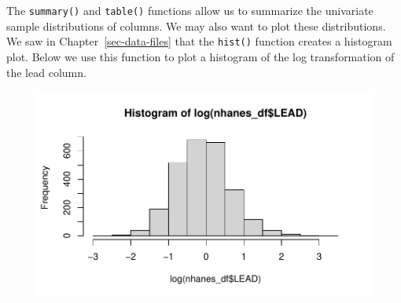 \documentclass[
  letterpaper,
]{krantz}
\makeatletter
\newenvironment{Shaded}{\begin{snugshade}}{\end{snugshade}}
\newcommand{\CommentTok}[1]{\textcolor[rgb]{0.37,0.37,0.37}{#1}}
\newcommand{\FunctionTok}[1]{\textcolor[rgb]{0.28,0.35,0.67}{#1}}
\newcommand{\NormalTok}[1]{\textcolor[rgb]{0.00,0.23,0.31}{#1}}
\newcommand{\OtherTok}[1]{\textcolor[rgb]{0.00,0.23,0.31}{#1}}
\newcommand{\SpecialCharTok}[1]{\textcolor[rgb]{0.37,0.37,0.37}{#1}}
\newcommand{\StringTok}[1]{\textcolor[rgb]{0.13,0.47,0.30}{#1}}
\newenvironment{kframe}{%
\medskip{}
\setlength{\fboxsep}{.8em}
 \def\at@end@of@kframe{}%
 \ifinner\ifhmode%
  \def\at@end@of@kframe{\end{minipage}}%
  \begin{minipage}{\columnwidth}%
 \fi\fi%
 \def\FrameCommand##1{\hskip\@totalleftmargin \hskip-\fboxsep
 \colorbox{shadecolor}{##1}\hskip-\fboxsep
     \hskip-\linewidth \hskip-\@totalleftmargin \hskip\columnwidth}%
 \MakeFramed {\advance\hsize-\width
   \@totalleftmargin\z@ \linewidth\hsize
   \@setminipage}}%
 {\par\unskip\endMakeFramed%
 \at@end@of@kframe}
\renewenvironment{Shaded}{\begin{kframe}}{\end{kframe}}
\makeatother
\begin{document}
\begin{Shaded}
\end{Shaded}

The \texttt{summary()} and \texttt{table()} functions allow us to
summarize the univariate sample distributions of columns. We may also
want to plot these distributions. We saw in Chapter~\ref{sec-data-files}
that the \texttt{hist()} function creates a histogram plot. Below we use
this function to plot a histogram of the log transformation of the lead
column.

\begin{Shaded}
\end{Shaded}

\begin{figure}[H]

{\centering \includegraphics[width=1\textwidth,height=\textheight]{book/4_exploratory_analysis_files/figure-pdf/unnamed-chunk-8-1.pdf}

}

\end{figure}
\end{document}
